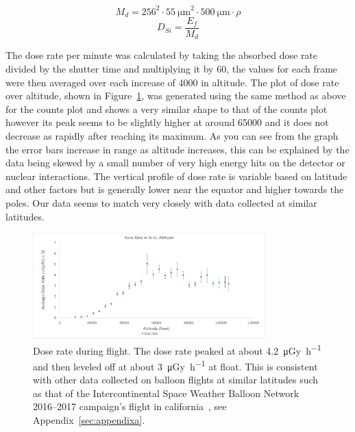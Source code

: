 	\begin{equation}
	M_{d} = 256^2 \cdot \SI{55}{\micro\meter}^2 \cdot \SI{500}{\micro\meter} \cdot \rho
      	\label{eq:detmass}
	\end{equation}
	\begin{equation}
	D_{Si} = \frac{E_{f}}{M_{d}}
	\label{eq:detdose}
	\end{equation}

The dose rate per minute was calculated by taking the absorbed dose rate divided by the shutter time and multiplying it by \num{60}, the values for each frame were then averaged over each increase of \SI{4000}{\feet} in altitude. The plot of dose rate over altitude, shown in Figure~\ref{fig:doserate}, was generated using the same method as above for the counts plot and shows a very similar shape to that of the counts plot however its peak seems to be slightly higher at around \SI{65000}{\feet} and it does not decrease as rapidly after reaching its maximum. As you can see from the graph the error bars increase in range as altitude increases, this can be explained by the data being skewed by a small number of very high energy hits on the detector or nuclear interactions. The vertical profile of dose rate is variable based on latitude and other factors but is generally lower near the equator and higher towards the poles. Our data seems to match very closely with data collected at similar latitudes.


\begin{figure}[h!]
\begin{center}

\includegraphics[width=0.8\textwidth]{./Figures/dosestderr.pdf}
\caption{Dose rate during flight.  The dose rate peaked at about \SI{4.2}{\micro\gray\per\hour} and then leveled off at about \SI{3}{\micro\gray\per\hour} at float. This is consistent with other data collected on balloon flights at similar latitudes such as that of the Intercontinental Space Weather Balloon Network 2016--2017 campaign's flight in california~\cite{spaceballoonnetwork}, see Appendix~\ref{sec:appendixa}.}
\label{fig:doserate}
\end{center}
\end{figure}


